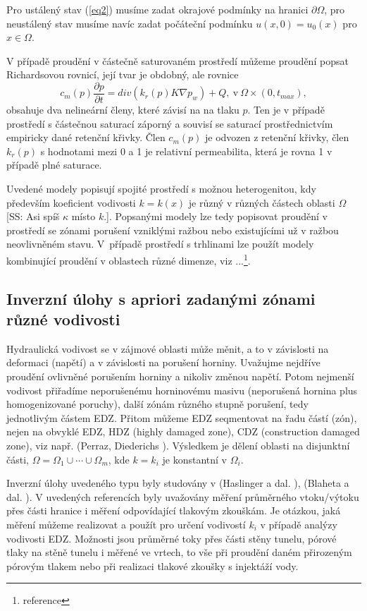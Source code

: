 \documentclass[a4paper]{article}
\newcommand{\alert}[1]{{\color{red}#1}}
\begin{document}
Pro ustálený stav (\ref{eq2}) musíme zadat okrajové podmínky na hranici $\partial \Omega$,
pro neustálený stav musíme navíc zadat počáteční podmínku $u(x, 0) = u_0(x)$
pro $x \in \Omega$.

V případě proudění v částečně saturovaném prostředí můžeme proudění
popsat Richardsovou rovnicí, její tvar je obdobný, ale rovnice
\begin{equation}\label{eq4}
	c_m (p) \frac{\partial p}{\partial t} = div (k_r(p) K\nabla p_w) + Q, \  \mbox{v} \ \Omega \times (0, t_{max}),
\end{equation}
obsahuje dva nelineární členy, které závisí na na tlaku $p$. Ten je v případě
prostředí s částečnou saturací záporný a souvisí se saturací prostřednictvím
empiricky dané retenční křivky. Člen $c_m(p)$ je odvozen z retenční křivky, člen $k_r(p)$ s hodnotami mezi 0 a 1 je relativní permeabilita, která je rovna
1 v případě plné saturace.

Uvedené modely popisují spojité prostředí s možnou heterogenitou, kdy
především koeficient vodivosti $k = k(x)$ je různý v různých částech oblasti $\Omega$ \alert{[SS: Asi spíš $\kappa$ místo $k$.]}. Popsanými modely lze tedy popisovat proudění v prostředí se zónami
porušení vzniklými ražbou nebo existujícími už v ražbou neovlivněném stavu.
V~případě prostředí s trhlinami lze použít modely kombinující proudění v
oblastech různé dimenze, viz ...\footnote{reference}.

\subsection{Inverzní úlohy s apriori zadanými zónami různé vodivosti}
Hydraulická vodivost se v zájmové oblasti může měnit, a to v závislosti na
deformaci (napětí) a v závislosti na porušení horniny. Uvažujme nejdříve
proudění ovlivněné porušením horniny a nikoliv změnou napětí. Potom nejmenší vodivost přiřadíme neporušenému horninovému masivu (neporušená
hornina plus homogenizované poruchy), další zónám různého stupně porušení,
tedy jednotlivým částem EDZ. Přitom můžeme EDZ seqmentovat na řadu
částí (zón), nejen na obvyklé EDZ, HDZ (highly damaged zone), CDZ (construction
damaged zone), viz např. (Perraz, Diederichs \cite{18}). Výsledkem je
dělení oblasti na disjunktní části, $\Omega = \Omega_1 \cup \cdots \cup \Omega_m$, kde $k = k_i$ je konstantní v $\Omega_i$.

Inverzní úlohy uvedeného typu byly studovány v (Haslinger a dal. \cite{17}),
(Blaheta a dal. \cite{15}). V uvedených referencích byly uvažovány měření průměrného
vtoku/výtoku přes části hranice i měření odpovídající tlakovým zkouškám.
Je otázkou, jaká měření můžeme realizovat a použít pro určení vodivostí 
$k_i$ v případě analýzy vodivosti EDZ. Možnosti jsou průměrné toky přes
části stěny tunelu, pórové tlaky na stěně tunelu i měřené ve vrtech, to vše
při proudění daném přirozeným pórovým tlakem nebo při realizaci tlakové
zkoušky s injektáží vody.
\end{document}
